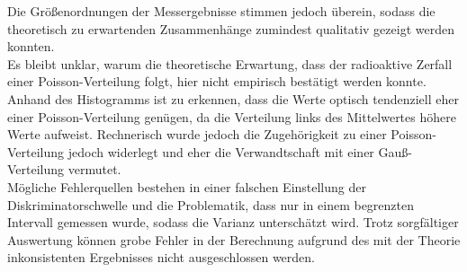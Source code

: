 Die Größenordnungen der Messergebnisse stimmen jedoch überein, sodass die theoretisch
zu erwartenden Zusammenhänge zumindest qualitativ gezeigt werden konnten.\\

Es bleibt unklar, warum die theoretische Erwartung, dass der radioaktive Zerfall einer
Poisson-Verteilung folgt, hier nicht empirisch bestätigt werden konnte. Anhand des
Histogramms ist zu erkennen, dass die Werte optisch tendenziell eher einer Poisson-Verteilung
genügen, da die Verteilung links des Mittelwertes höhere Werte aufweist. Rechnerisch wurde
jedoch die Zugehörigkeit zu einer Poisson-Verteilung jedoch widerlegt und eher die Verwandtschaft
mit einer Gauß-Verteilung vermutet.\\
Mögliche Fehlerquellen bestehen in einer falschen Einstellung der Diskriminatorschwelle und die
Problematik, dass nur in einem begrenzten Intervall gemessen wurde, sodass die Varianz unterschätzt wird.
Trotz sorgfältiger Auswertung können grobe Fehler in der Berechnung aufgrund des
mit der Theorie inkonsistenten Ergebnisses nicht ausgeschlossen werden.
